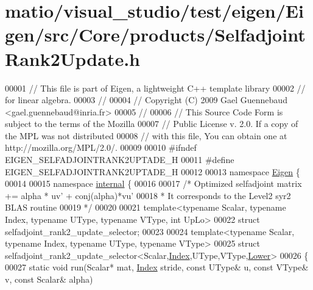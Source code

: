 \hypertarget{matio_2visual__studio_2test_2eigen_2_eigen_2src_2_core_2products_2_selfadjoint_rank2_update_8h_source}{}\section{matio/visual\+\_\+studio/test/eigen/\+Eigen/src/\+Core/products/\+Selfadjoint\+Rank2\+Update.h}
\label{matio_2visual__studio_2test_2eigen_2_eigen_2src_2_core_2products_2_selfadjoint_rank2_update_8h_source}

\begin{DoxyCode}
00001 \textcolor{comment}{// This file is part of Eigen, a lightweight C++ template library}
00002 \textcolor{comment}{// for linear algebra.}
00003 \textcolor{comment}{//}
00004 \textcolor{comment}{// Copyright (C) 2009 Gael Guennebaud <gael.guennebaud@inria.fr>}
00005 \textcolor{comment}{//}
00006 \textcolor{comment}{// This Source Code Form is subject to the terms of the Mozilla}
00007 \textcolor{comment}{// Public License v. 2.0. If a copy of the MPL was not distributed}
00008 \textcolor{comment}{// with this file, You can obtain one at http://mozilla.org/MPL/2.0/.}
00009 
00010 \textcolor{preprocessor}{#ifndef EIGEN\_SELFADJOINTRANK2UPTADE\_H}
00011 \textcolor{preprocessor}{#define EIGEN\_SELFADJOINTRANK2UPTADE\_H}
00012 
00013 \textcolor{keyword}{namespace }\hyperlink{namespace_eigen}{Eigen} \{ 
00014 
00015 \textcolor{keyword}{namespace }\hyperlink{namespaceinternal}{internal} \{
00016 
00017 \textcolor{comment}{/* Optimized selfadjoint matrix += alpha * uv' + conj(alpha)*vu'}
00018 \textcolor{comment}{ * It corresponds to the Level2 syr2 BLAS routine}
00019 \textcolor{comment}{ */}
00020 
00021 \textcolor{keyword}{template}<\textcolor{keyword}{typename} Scalar, \textcolor{keyword}{typename} Index, \textcolor{keyword}{typename} UType, \textcolor{keyword}{typename} VType, \textcolor{keywordtype}{int} UpLo>
00022 \textcolor{keyword}{struct }selfadjoint\_rank2\_update\_selector;
00023 
00024 \textcolor{keyword}{template}<\textcolor{keyword}{typename} Scalar, \textcolor{keyword}{typename} Index, \textcolor{keyword}{typename} UType, \textcolor{keyword}{typename} VType>
00025 \textcolor{keyword}{struct }selfadjoint\_rank2\_update\_selector<Scalar,\hyperlink{namespace_eigen_a62e77e0933482dafde8fe197d9a2cfde}{Index},UType,VType,\hyperlink{group__enums_gga39e3366ff5554d731e7dc8bb642f83cda891792b8ed394f7607ab16dd716f60e6}{Lower}>
00026 \{
00027   \textcolor{keyword}{static} \textcolor{keywordtype}{void} run(Scalar* mat, \hyperlink{namespace_eigen_a62e77e0933482dafde8fe197d9a2cfde}{Index} stride, \textcolor{keyword}{const} UType& u, \textcolor{keyword}{const} VType& v, \textcolor{keyword}{const} Scalar& alpha)

\end{DoxyCode}
